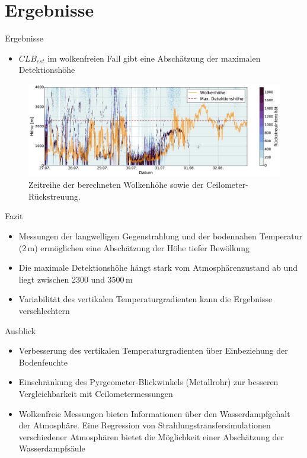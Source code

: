 \documentclass{beamer}
\begin{document}
\section{Ergebnisse}
\begin{frame}{Ergebnisse}
\begin{itemize}
  \item $CLB_{est}$ im wolkenfreien Fall gibt eine Abschätzung der maximalen
      Detektionshöhe
\end{itemize}
\begin{figure}[ht]
    \centering
    \includegraphics[width=1\textwidth]{figures/ceilometer.png}
    \caption{Zeitreihe der berechneten Wolkenhöhe sowie der Ceilometer-Rückstreuung.}
    \label{fig:clb}
\end{figure}
\end{frame}

\begin{frame}{Fazit}
\begin{itemize}
  \vfill\item Messungen der langwelligen Gegenstrahlung und der bodennahen
      Temperatur (2\,m) ermöglichen eine Abschätzung der Höhe tiefer Bewölkung
  \vfill\item Die maximale Detektionshöhe hängt stark vom Atmosphärenzustand ab
      und liegt zwischen 2300 und 3500\,m
  \vfill\item Variabilität des vertikalen Temperaturgradienten kann die
      Ergebnisse verschlechtern 
\vfill
\end{itemize}
\end{frame}

\begin{frame}{Ausblick}
\begin{itemize}
  \vfill\item Verbesserung des vertikalen Temperaturgradienten über
      Einbeziehung der Bodenfeuchte
  \vfill\item Einschränkung des Pyrgeometer-Blickwinkels (Metallrohr) zur
      besseren Vergleichbarkeit mit Ceilometermessungen
  \vfill\item Wolkenfreie Messungen bieten Informationen über den
      Wasserdampfgehalt der Atmosphäre. Eine Regression von
        Strahlungstransfersimulationen verschiedener Atmosphären bietet die
        Möglichkeit einer Abschätzung der Wasserdampfsäule
  \vfill
\end{itemize}
\end{frame}
\end{document}
